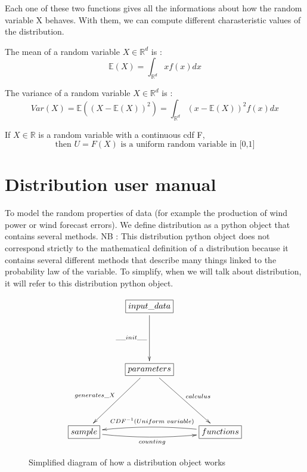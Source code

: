 \documentclass{article}
\begin{document}
	Each one of these two functions gives all the informations about how the random variable X behaves. With them, we can compute different charasteristic values of the distribution.

	\begin{definition}
	The mean of a random variable $X \in \mathbb{R}^d$ is :
	\begin{equation*}
	\mathbb{E}(X) = \int_{\mathbb{R}^d} xf(x)dx
	\end{equation*}
	\end{definition}

	\begin{definition}
	The variance of a random variable $X \in \mathbb{R}^d$ is :
	\begin{equation*}
	Var(X) = \mathbb{E}((X-\mathbb{E}(X))^2) = \int_{\mathbb{R}^d} (x-\mathbb{E}(X))^2f(x)dx
	\end{equation*}
	\end{definition}

	\begin{property}
	If $X \in \mathbb{R}$ is a random variable with a continuous cdf F,
	\begin{equation*}
	\text{then } U = F(X) \text{ is a uniform random variable in [0,1]}
	\end{equation*}
	\end{property}

	\section{Distribution user manual}

	To model the random properties of data (for example the production of wind power or wind forecast errors). We define distribution as a python object that contains several methods. NB : This distribution python object does not correspond strictly to the mathematical definition of a distribution because it contains several different methods that describe many things linked to the probability law of the variable. To simplify, when we will talk about distribution, it will refer to this distribution python object.

	\begin{figure}[H]
\[
   	\xymatrix{
   		 & \boxed{input\_data} \ar[dd]_{\_\_init\_\_} & \\
   		 & & \\
   		 & \boxed{parameters} \ar[ldd]_{generates\_X} \ar[rdd]^{calculus} & \\
   		 & & \\
   		\boxed{sample} \ar@/_/[rr]_{counting} & & \boxed{functions} \ar@/_/[ll]_{CDF^{-1}(Uniform\text{ }variable)}
   	}
   \]
   \caption{Simplified diagram of how a distribution object  works}
	\end{figure}
\end{document}

